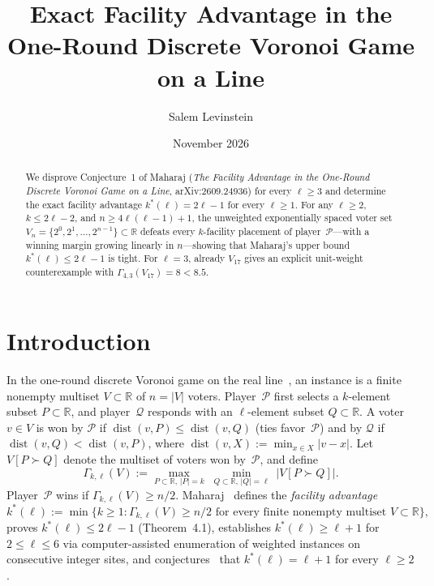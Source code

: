 \documentclass[11pt]{article}
\title{Exact Facility Advantage in the One-Round Discrete Voronoi Game on a Line}
\author{Salem Levinstein}
\date{November 2026}
\newcommand{\dist}{\operatorname{dist}}
\begin{document}
\maketitle

\begin{abstract}
We disprove Conjecture~1 of Maharaj (\emph{The Facility Advantage in the One-Round Discrete Voronoi Game on a Line}, arXiv:2609.24936) for every $\ell \ge 3$ and determine the exact facility advantage $k^*(\ell) = 2\ell - 1$ for every $\ell \ge 1$. For any $\ell \ge 2$, $k \le 2\ell - 2$, and $n \ge 4\ell(\ell - 1) + 1$, the unweighted exponentially spaced voter set $V_n = \{2^0, 2^1, \dots, 2^{n-1}\} \subset \mathbb{R}$ defeats every $k$-facility placement of player~$\mathcal{P}$—with a winning margin growing linearly in $n$—showing that Maharaj's upper bound $k^*(\ell) \le 2\ell - 1$ is tight. For $\ell = 3$, already $V_{17}$ gives an explicit unit-weight counterexample with $\Gamma_{4,3}(V_{17}) = 8 < 8.5$.
\end{abstract}

\section{Introduction}

In the one-round discrete Voronoi game on the real line~\cite{Maharaj2026,BBD2013,dBKM2019}, an instance is a finite nonempty multiset $V \subset \mathbb{R}$ of $n = |V|$ voters. Player~$\mathcal{P}$ first selects a $k$-element subset $P \subset \mathbb{R}$, and player~$\mathcal{Q}$ responds with an $\ell$-element subset $Q \subset \mathbb{R}$. A voter $v \in V$ is won by $\mathcal{P}$ if $\dist(v, P) \le \dist(v, Q)$ (ties favor~$\mathcal{P}$) and by $\mathcal{Q}$ if $\dist(v, Q) < \dist(v, P)$, where $\dist(v, X) := \min_{x \in X}|v - x|$. Let $V[P \succ Q]$ denote the multiset of voters won by~$\mathcal{P}$, and define
\[
\Gamma_{k,\ell}(V) := \max_{P \subset \mathbb{R},\,|P| = k}\;\min_{Q \subset \mathbb{R},\,|Q| = \ell}\;\bigl|V[P \succ Q]\bigr|.
\]
Player~$\mathcal{P}$ wins if $\Gamma_{k,\ell}(V) \ge n/2$. Maharaj~\cite[Definition~1]{Maharaj2026} defines the \emph{facility advantage}
\[
k^*(\ell) := \min\bigl\{k \ge 1 : \Gamma_{k,\ell}(V) \ge n/2 \text{ for every finite nonempty multiset } V \subset \mathbb{R}\bigr\},
\]
proves $k^*(\ell) \le 2\ell - 1$ (Theorem~4.1), establishes $k^*(\ell) \ge \ell + 1$ for $2 \le \ell \le 6$ via computer-assisted enumeration of weighted instances on consecutive integer sites, and conjectures~\cite[Conjecture~1]{Maharaj2026} that $k^*(\ell) = \ell + 1$ for every $\ell \ge 2$.
\end{document}
